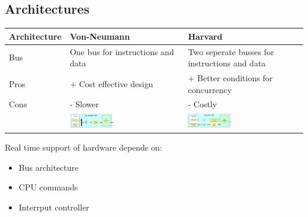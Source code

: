 \subsection{Architectures}
\begin{tabularx}{\textwidth}{lXX}\hline
  Architecture & Von-Neumann                                                             & Harvard                                                             \\\hline
  Bus          & One bus for instructions and data                                       & Two seperate busses for instructions and data                       \\
  Pros         & + Cost effective design                                                 & + Better conditions for concurrency                                 \\
  Cons         & - Slower                                                                & - Costly                                                            \\
               & \includegraphics[width=0.4\textwidth]{images/RTSystems/von_neumann.png} & \includegraphics[width=0.4\textwidth]{images/RTSystems/harvard.png} \\\hline
\end{tabularx}

Real time support of hardware depends on:
\begin{itemize}
  \item Bus architecture
  \item CPU commands
  \item Interrput controller
\end{itemize}